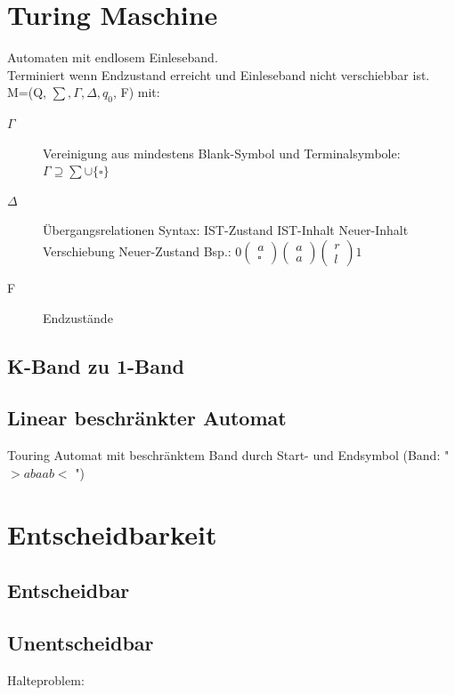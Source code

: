 \documentclass[12pt,a4paper]{article}
\begin{document}
\section{Turing Maschine}
	Automaten mit endlosem Einleseband.\\
	Terminiert wenn Endzustand erreicht und Einleseband nicht verschiebbar ist.\\
	M=(Q, $\sum, \Gamma , \Delta , q_0$, F) mit:\\
	\begin{description}
		\item[$\Gamma$] Vereinigung aus mindestens Blank-Symbol und Terminalsymbole: $\Gamma \supseteq \sum \cup \{ \square \} $
		\item[$\Delta$] Übergangsrelationen Syntax: IST-Zustand IST-Inhalt Neuer-Inhalt Verschiebung Neuer-Zustand Bsp.: $0 \left( \begin{array}{c} a \\ \square \end{array}\right) \left( \begin{array}{c} a \\ a \end{array}\right) \left( \begin{array}{c} r \\ l \end{array} \right) 1$
		\item[F] Endzustände
	\end{description}

	\subsection{K-Band zu 1-Band}

	\subsection{Linear beschränkter Automat}
		Touring Automat mit beschränktem Band durch Start- und Endsymbol (Band: " $>abaab<$ ")

\section{Entscheidbarkeit}
	\subsection{Entscheidbar}

	\subsection{Unentscheidbar}
		Halteproblem:
\end{document}
